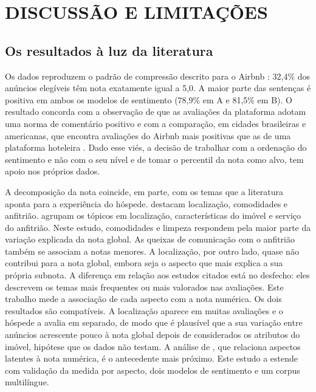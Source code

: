 \section{DISCUSSÃO E LIMITAÇÕES}

\subsection{Os resultados à luz da literatura}

Os dados reproduzem o padrão de compressão descrito para o Airbnb \citep{zervas2021}: 32,4\% dos anúncios elegíveis têm nota exatamente igual a 5,0. A maior parte das sentenças é positiva em ambos os modelos de sentimento (78,9\% em A e 81,5\% em B). O resultado concorda com a observação de que as avaliações da plataforma adotam uma norma de comentário positivo \citep{bridges2016} e com a comparação, em cidades brasileiras e americanas, que encontra avaliações do Airbnb mais positivas que as de uma plataforma hoteleira \citep{santos2020}. Dado esse viés, a decisão de trabalhar com a ordenação do sentimento e não com o seu nível e de tomar o percentil da nota como alvo, tem apoio nos próprios dados.

A decomposição da nota coincide, em parte, com os temas que a literatura aponta para a experiência do hóspede. \citet{cheng2019} destacam localização, comodidades e anfitrião. \citet{sutherland2020} agrupam os tópicos em localização, características do imóvel e serviço do anfitrião. Neste estudo, comodidades e limpeza respondem pela maior parte da variação explicada da nota global. As queixas de comunicação com o anfitrião também se associam a notas menores. A localização, por outro lado, quase não contribui para a nota global, embora seja o aspecto que mais explica a sua própria subnota. A diferença em relação aos estudos citados está no desfecho: eles descrevem os temas mais frequentes ou mais valorados nas avaliações. Este trabalho mede a associação de cada aspecto com a nota numérica. Os dois resultados são compatíveis. A localização aparece em muitas avaliações e o hóspede a avalia em separado, de modo que é plausível que a sua variação entre anúncios acrescente pouco à nota global depois de considerados os atributos do imóvel, hipótese que os dados não testam. A análise de \citet{luo2019}, que relaciona aspectos latentes à nota numérica, é o antecedente mais próximo. Este estudo a estende com validação da medida por aspecto, dois modelos de sentimento e um corpus multilíngue.


